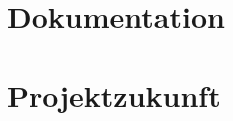 \documentclass[12pt]{article}
\begin{document}
\newpage
\section{Dokumentation}

\newpage
\section{Projektzukunft}
\end{document}
